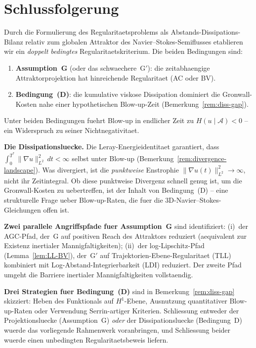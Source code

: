 \documentclass[12pt,a4paper]{article}
\theoremstyle{definition}
\theoremstyle{plain}
\theoremstyle{remark}
\begin{document}
\section{Schlussfolgerung}
Durch die Formulierung des Regularitaetsproblems als Abstands-Dissipations-Bilanz
relativ zum globalen Attraktor des Navier--Stokes-Semiflusses etablieren wir
ein \emph{doppelt bedingtes} Regularitaetskriterium. Die beiden
Bedingungen sind:
\begin{enumerate}
  \item \textbf{Assumption~G} (oder das schwaechere~G$'$): die zeitabhaengige
    Attraktorprojektion hat hinreichende Regularitaet (AC oder BV).
  \item \textbf{Bedingung~(D)}: die kumulative viskose Dissipation
    dominiert die Gronwall-Kosten nahe einer hypothetischen Blow-up-Zeit
    (Bemerkung~\ref{rem:diss-gap}).
\end{enumerate}
Unter beiden Bedingungen fuehrt Blow-up in endlicher Zeit zu
$H(u \mid \mathcal{A}) < 0$ -- ein Widerspruch zu seiner Nichtnegativitaet.

\medskip\noindent
\textbf{Die Dissipationsluecke.}\;
Die Leray-Energieidentitaet garantiert, dass
$\int_0^{T^*}\|\nabla u\|_{L^2}^2\,dt < \infty$ selbst unter Blow-up
(Bemerkung~\ref{rem:divergence-landscape}). Was divergiert, ist die
\emph{punktweise} Enstrophie $\|\nabla u(t)\|_{L^2}^2 \to \infty$,
nicht ihr Zeitintegral. Ob diese punktweise Divergenz schnell
genug ist, um die Gronwall-Kosten zu uebertreffen, ist der Inhalt von
Bedingung~(D) -- eine strukturelle Frage ueber Blow-up-Raten, die
fuer die 3D-Navier--Stokes-Gleichungen offen ist.

\medskip\noindent
\textbf{Zwei parallele Angriffspfade fuer Assumption~G} sind identifiziert:
(i)~der AGC-Pfad, der~G auf positiven Reach des Attraktors reduziert
(aequivalent zur Existenz inertialer Mannigfaltigkeiten);
(ii)~der log-Lipschitz-Pfad (Lemma~\ref{lem:LL-BV}), der~G$'$ auf
Trajektorien-Ebene-Regularitaet (TLL) kombiniert mit Log-Abstand-Integrierbarkeit (LDI) reduziert. Der zweite Pfad umgeht die Barriere inertialer Mannigfaltigkeiten
vollstaendig.

\medskip\noindent
\textbf{Drei Strategien fuer Bedingung~(D)} sind in
Bemerkung~\ref{rem:diss-gap} skizziert: Heben des Funktionals auf $H^1$-Ebene,
Ausnutzung quantitativer Blow-up-Raten oder Verwendung Serrin-artiger Kriterien.
Schliessung entweder der Projektionsluecke (Assumption~G) \emph{oder} der
Dissipationsluecke (Bedingung~D) wuerde das vorliegende Rahmenwerk voranbringen,
und Schliessung beider wuerde einen unbedingten Regularitaetsbeweis liefern.
\end{document}
